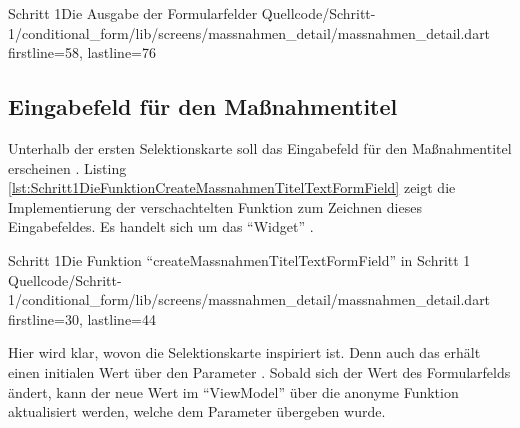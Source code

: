 \clearpage

\begin{alexlisting}{Schritt 1}{Die Ausgabe der Formularfelder}
  {Quellcode/Schritt-1/conditional_form/lib/screens/massnahmen_detail/massnahmen_detail.dart}
  {firstline=58, lastline=76}
  \label{lst:Schritt1AusgabeDerFormularfelder}
\end{alexlisting}

\subsection{Eingabefeld für den Maßnahmentitel}


Unterhalb der ersten Selektionskarte soll das Eingabefeld für den Maßnahmentitel erscheinen .
Listing \ref{lst:Schritt1DieFunktionCreateMassnahmenTitelTextFormField} zeigt die Implementierung der verschachtelten Funktion zum Zeichnen dieses Eingabefeldes.
 Es handelt sich um das \enquote{Widget}  .


\begin{alexlisting}{Schritt 1}{Die Funktion \enquote{createMassnahmenTitelTextFormField} in Schritt 1}
  {Quellcode/Schritt-1/conditional_form/lib/screens/massnahmen_detail/massnahmen_detail.dart}
  {firstline=30, lastline=44}
  \label{lst:Schritt1DieFunktionCreateMassnahmenTitelTextFormField}
\end{alexlisting}

Hier wird klar, wovon die Selektionskarte inspiriert ist.
Denn auch das  erhält einen initialen Wert über den Parameter .
Sobald sich der Wert des Formularfelds ändert, kann der neue Wert im \enquote{ViewModel} über die anonyme Funktion aktualisiert werden, welche dem Parameter  übergeben wurde.
